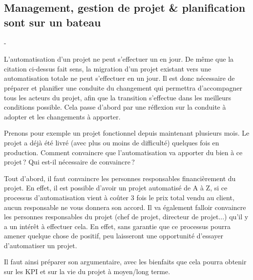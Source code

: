 
\subsection{Management, gestion de projet \& planification sont sur un bateau}


\epigraph{}{ - \citeauthor{manmonth} \cite{manmonth}}

L'automatisation d'un projet ne peut s'effectuer un en jour. De même que la citation ci-dessus fait sens, la migration d'un projet existant vers une automatisation totale ne peut s'effectuer en un jour. Il est donc nécessaire de préparer et planifier une conduite du changement qui permettra d'accompagner tous les acteurs du projet, afin que la transition s'effectue dans les meilleurs conditions possible. Cela passe d'abord par une réflexion sur la conduite à adopter et les changements à apporter. 

Prenons pour exemple un projet fonctionnel depuis maintenant plusieurs mois. Le projet a déjà été livré (avec plus ou moins de difficulté) quelques fois en production. Comment convaincre que l'automatisation va apporter du bien à ce projet ? Qui est-il nécessaire de convaincre ?

Tout d'abord, il faut convaincre les personnes responsables financièrement du projet. En effet, il est possible d'avoir un projet automatisé de A à Z, si ce processus d'automatisation vient à coûter 3 fois le prix total vendu au client, aucun responsable ne vous donnera son accord. Il va également falloir convaincre les personnes responsables du projet (chef de projet, directeur de projet...) qu'il y a un intérêt à effectuer cela. En effet, sans garantie que ce processus pourra amener quelque chose de positif, peu laisseront une opportunité d'essayer d'automatiser un projet.

Il faut ainsi préparer son argumentaire, avec les bienfaits que cela pourra obtenir sur les \gls{KPI} et sur la vie du projet à moyen/long terme.

